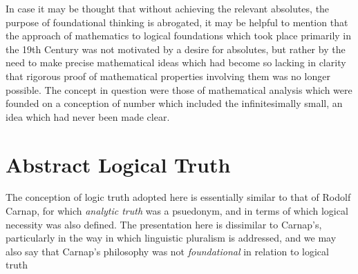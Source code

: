 In case it may be thought that without achieving the relevant absolutes, the purpose of foundational thinking is abrogated, it may be helpful to mention that the approach of mathematics to logical foundations which took place primarily in the 19th Century was not motivated by a desire for absolutes, but rather by the need to make precise mathematical ideas which had become so lacking in clarity that rigorous proof of mathematical properties involving them was no longer possible.
The concept in question were those of mathematical analysis which were founded on a conception of number which included the infinitesimally small, an idea which had never been made clear.



\section{Abstract Logical Truth}

The conception of logic truth adopted here is essentially similar to that of Rodolf Carnap, for which \emph{analytic truth} was a psuedonym, and in terms of which logical necessity was also defined.
The presentation here is dissimilar to Carnap's, particularly in the way in which linguistic pluralism is addressed, and we may also say that Carnap's philosophy was not \emph{foundational} in relation to logical truth 
